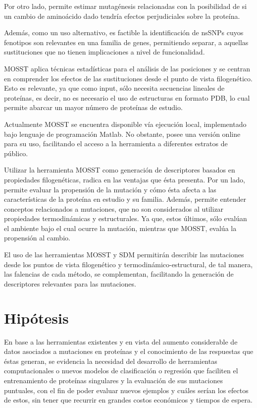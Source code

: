 Por otro lado, permite estimar mutagénesis relacionadas con la posibilidad de si un cambio de aminoácido dado tendría efectos perjudiciales sobre la proteína. 

Además, como un uso alternativo, es factible la identificación de nsSNPs cuyos fenotipos son relevantes en una familia de genes, permitiendo separar, a aquellas sustituciones que no tienen implicaciones a nivel de funcionalidad.


MOSST aplica técnicas estadísticas para el análisis de las posiciones y se centran en comprender los efectos de las sustituciones desde el punto de vista filogenético. Esto es relevante, ya que como input, sólo necesita secuencias lineales de proteínas, es decir, no es necesario el uso de estructuras en formato PDB, lo cual permite abarcar un mayor número de proteínas de estudio.

Actualmente MOSST se encuentra disponible vía ejecución local, implementado bajo lenguaje de programación Matlab. No obstante, posee una versión online para su uso, facilitando el acceso a la herramienta a diferentes estratos de público.

Utilizar la herramienta MOSST como generación de descriptores basados en propiedades filogenéticas, radica en las ventajas que ésta presenta. Por un lado, permite evaluar la propensión de la mutación y cómo ésta afecta a las características de la proteína en estudio y su familia. Además, permite entender conceptos relacionados a mutaciones, que no son considerados al utilizar propiedades termodinámicas y estructurales. Ya que, estos últimos, sólo evalúan el ambiente bajo el cual ocurre la mutación, mientras que MOSST, evalúa la propensión al cambio. 

El uso de las herramientas MOSST y SDM permitirán describir las mutaciones desde los puntos de vista filogenético y termodinámico-estructural, de tal manera, las falencias de cada método, se complementan, facilitando la generación de descriptores relevantes para las mutaciones.

\section{Hipótesis}

En base a las herramientas existentes y en vista del aumento considerable de datos asociados a mutaciones en proteínas y el conocimiento de las respuestas que éstas generan, se evidencia la necesidad del desarrollo de herramientas computacionales o nuevos modelos de clasificación o regresión que faciliten el entrenamiento de proteínas singulares y la evaluación de sus mutaciones puntuales, con el fin de poder evaluar nuevos ejemplos y cuáles serían los efectos de estos, sin tener que recurrir en grandes costos económicos y tiempos de espera. 

